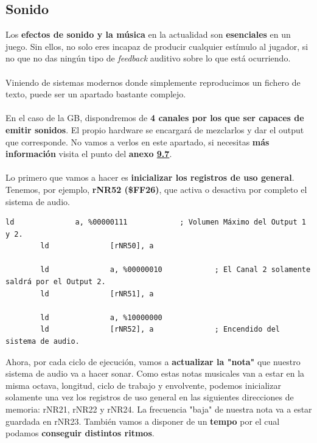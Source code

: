\subsection{Sonido}

Los \textbf{efectos de sonido y la música} en la actualidad son \textbf{esenciales} en un juego. Sin ellos, no solo eres incapaz de producir cualquier estímulo al jugador, si no que no das ningún tipo de \textit{feedback} auditivo sobre lo que está ocurriendo.
\\ \\
Viniendo de sistemas modernos donde simplemente reproducimos un fichero de texto, puede ser un apartado bastante complejo.
\\ \\
En el caso de la GB, dispondremos de \textbf{4 canales por los que ser capaces de emitir sonidos}. El propio hardware se encargará de mezclarlos y dar el output que corresponde. No vamos a verlos en este apartado, si necesitas \textbf{más información} visita el punto del \textbf{anexo \hyperref[anexo:sonido]{9.7}}.
\\ \\
Lo primero que vamos a hacer es \textbf{inicializar los registros de uso general}. Tenemos, por ejemplo, \textbf{rNR52 (\$FF26)}, que activa o desactiva por completo el sistema de audio. 

\begin{lstlisting}[caption={Inicialización Registros de Sonido de Uso General}, label={code:generalregisters}]
        ld              a, %00000111            ; Volumen Máximo del Output 1 y 2.
        ld              [rNR50], a
 
        ld              a, %00000010            ; El Canal 2 solamente saldrá por el Output 2.
        ld              [rNR51], a
        
        ld              a, %10000000
        ld              [rNR52], a 			 	; Encendido del sistema de audio.
\end{lstlisting}

Ahora, por cada ciclo de ejecución, vamos a \textbf{actualizar la "nota"} que nuestro sistema de audio va a hacer sonar. Como estas notas musicales van a estar en la misma octava, longitud, ciclo de trabajo y envolvente, podemos inicializar solamente una vez los registros de uso general en las siguientes direcciones de memoria: rNR21, rNR22 y rNR24. La frecuencia "baja" de nuestra nota va a estar guardada en rNR23. También vamos a disponer de un \textbf{tempo} por el cual podamos \textbf{conseguir distintos ritmos}.

